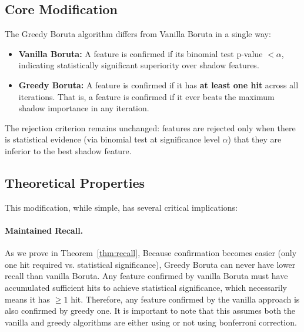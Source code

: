 \documentclass[runningheads]{llncs}
\begin{document}
\subsection{Core Modification}
\label{sec:method:modification}

The Greedy Boruta algorithm differs from Vanilla Boruta in a single way:

\begin{itemize}
    \item \textbf{Vanilla Boruta:} A feature is confirmed if its binomial test p-value $< \alpha$, indicating statistically significant superiority over shadow features.
    \item \textbf{Greedy Boruta:} A feature is confirmed if it has \textbf{at least one hit} across all iterations. That is, a feature is confirmed if it ever beats the maximum shadow importance in any iteration.
\end{itemize}

The rejection criterion remains unchanged: features are rejected only when there is statistical evidence (via binomial test at significance level $\alpha$) that they are inferior to the best shadow feature.

\subsection{Theoretical Properties}
\label{sec:method:theory}

This modification, while simple, has several critical implications:

\paragraph{Maintained Recall.}
As we prove in Theorem~\ref{thm:recall}, Because confirmation becomes easier (only one hit required vs. statistical significance), Greedy Boruta can never have lower recall than vanilla Boruta. Any feature confirmed by vanilla Boruta must have accumulated sufficient hits to achieve statistical significance, which necessarily means it has $\geq 1$ hit. Therefore, any feature confirmed by the vanilla approach is also confirmed by greedy one. It is important to note that this assumes both the vanilla and greedy algorithms are either using or not using bonferroni correction.

\end{document}

